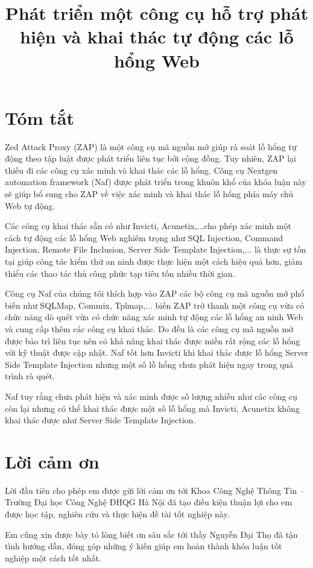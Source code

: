 \documentclass[12pt,a4paper]{report}
\title{Phát triển một công cụ hỗ trợ phát hiện và khai thác tự động các lỗ hổng Web}
\begin{document}

\clearpage{}

\chapter*{Tóm tắt}

Zed Attack Proxy (ZAP) là một công cụ mã nguồn mở giúp rà soát lỗ hổng tự động theo tập luật được phát triển liên tục bởi cộng đồng. Tuy nhiên, ZAP lại thiếu đi các công cụ xác minh và khai thác các lỗ hổng. Công cụ Nextgen automation framework (Naf) được phát triển trong khuôn khổ của khóa luận này sẽ giúp bổ sung cho ZAP về việc xác minh và khai thác lỗ hổng phía máy chủ Web tự động.

Các công cụ khai thác sẵn có như Invicti, Acunetix,...cho phép xác minh một cách tự động các lỗ hổng Web nghiêm trọng như SQL Injection, Command Injection, Remote File Inclusion, Server Side Template Injection,... là thực sự tồn tại giúp công tác kiểm thử an ninh được thực hiện một cách hiệu quả hơn, giảm thiểu các thao tác thủ công phức tạp tiêu tốn nhiều thời gian.

Công cụ Naf của chúng tôi thích hợp vào ZAP các bộ công cụ mã nguồn mở phổ biến như SQLMap, Commix, Tplmap,... biến ZAP trở thanh một công cụ vừa có chức năng dò quét vừa có chức năng xác minh tự động các lỗ hổng an ninh Web và cung cấp thêm các công cụ khai thác. Do đều là các công cụ mã nguồn mở được bảo trì liên tục nên có khả năng khai thác được miền rất rộng các lỗ hổng với kỹ thuật được cập nhật. Naf tốt hơn Invicti khi khai thác được lỗ hổng Server Side Template Injection nhưng một số lỗ hổng chưa phát hiện ngay trong quá trình rà quét.

Naf tuy rằng chưa phát hiện và xác minh được số lượng nhiều như các công cụ còn lại nhưng có thể khai thác được một số lỗ hổng mà Invicti, Acunetix không khai thác được như Server Side Template Injection.

\chapter*{Lời cảm ơn}

Lời đầu tiên cho phép em được gửi lời cảm ơn tới Khoa Công Nghệ Thông Tin – Trường Đại học Công Nghệ ĐHQG Hà Nội đã tạo điều kiện thuận lợi cho em được học tập, nghiên cứu và thực hiện đề tài tốt nghiệp này.

Em cũng xin được bày tỏ lòng biết ơn sâu sắc tới thầy Nguyễn Đại Thọ đã tận tình hướng dẫn, đóng góp những ý kiến giúp em hoàn thành khóa luận tốt nghiệp một cách tốt nhất.
\end{document}

